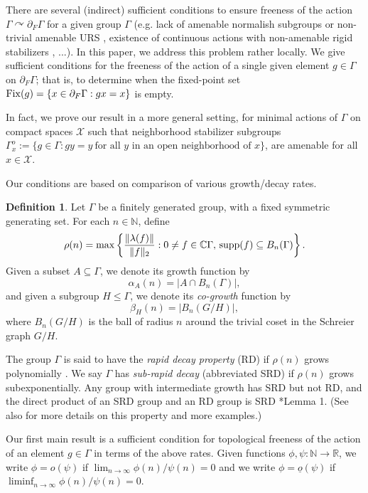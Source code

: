 \documentclass[12pt]{amsart}
\theoremstyle{definition}
\newtheorem{defn}[theorem]{Definition}
\theoremstyle{remark}
\newcommand{\act}{\curvearrowright}
\newcommand{\cX}{\mathcal{X}}
\newcommand{\bN}{{\mathbb{N}}}
\newcommand{\bR}{{\mathbb{R}}}
\newcommand{\C}{\mathbb C}
\newcommand{\G}{\Gamma}
\begin{document}
There are several (indirect) sufficient conditions to ensure freeness of the action $\G\act\partial_F\G$ for a given group $\G$ (e.g. lack of amenable normalish subgroups \cite{BKKO2017} or non-trivial amenable URS \cite{Ken15}, existence of continuous actions with non-amenable rigid stabilizers \cite{LeB-MBon18}, ...).
In this paper, we address this problem rather locally. We give sufficient conditions for the freeness of the action of a single given element $g\in \G$ on $\partial_F\G$; that is, to determine when the fixed-point set ${\rm Fix}(g)=\{x\in \partial_F\G : gx=x\}$ is empty.

In fact, we prove our result in a more general setting, for minimal actions of $\G$ on compact spaces $\mathcal{X}$ such that neighborhood stabilizer subgroups $\G_x^o:=\{g\in \G : gy=y ~ \text{for all $y$ in an open neighborhood of $x$}\}$, are amenable for all $x\in \cX$.

Our conditions are based on comparison of various growth/decay rates.

\begin{defn}\label{SRD}
Let $\G$ be a finitely generated group, with a fixed symmetric generating set. 
For each $n\in\bN$, define
\begin{equation*}
\rho(n) = \max\left\{\frac{\|\lambda(f)\|}{\|f\|_2}: 0\neq f\in \C\Gamma,\, {\rm supp}(f)\subseteq B_n(\G)\right\} .
\end{equation*}
Given a subset $A\subseteq\G$, we denote its growth function by
\begin{equation*}\alpha_{\scriptscriptstyle A}(n) = |A\cap B_n(\G)| ,
\end{equation*}
and given a subgroup $H\le\G$, we denote its \emph{co-growth} function by
\begin{equation*}
\beta_{\scriptscriptstyle H}(n) = |B_n(G/H)| ,\end{equation*}
where $B_n(G/H)$ is the ball of radius $n$ around the trivial coset in the Schreier graph $G/H$.
\end{defn}

The group $\G$ is said to have the \emph{rapid decay property} (RD) if $\rho(n)$ grows polynomially \cite{joli}. 
We say $\G$ has \emph{sub-rapid decay} (abbreviated SRD) if $\rho(n)$ grows subexponentially.  
Any group with intermediate growth has SRD but not RD, and the direct product of an SRD group and an RD group is SRD \cite{KS2025}*{Lemma 1}. (See also \cite{SriGreg-SRD} for more details on this property and more examples.)

Our first main result is a sufficient condition for topological freeness of the action of an element $g\in \G$ in terms of the above rates. Given functions $\phi, \psi: \bN\to\bR$, we write $\phi=o(\psi)$ if $\lim_{n\to\infty}\phi(n)/\psi(n)= 0$ and we write $\phi=\underline{o}(\psi)$ if $\liminf_{n\to\infty}\phi(n)/\psi(n)= 0$.
\end{document}

